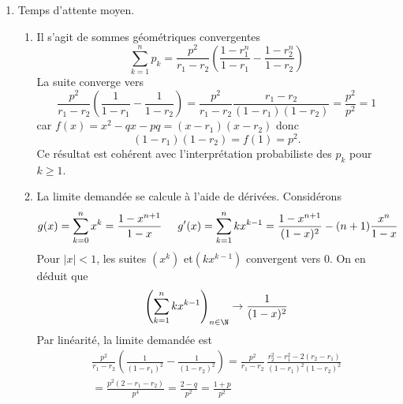 \begin{enumerate}
 \item Temps d'attente moyen.
\begin{enumerate}
 \item Il s'agit de sommes géométriques convergentes
\begin{displaymath}
\sum_{k=1}^{n}p_k = \frac{p^2}{r_1-r_2}\left( \frac{1-r_1^{n}}{1-r_1} - \frac{1-r_2^{n}}{1-r_2}\right)  
\end{displaymath}
 La suite converge vers 
\begin{displaymath}
\frac{p^2}{r_1-r_2}\left( \frac{1}{1-r_1} - \frac{1}{1-r_2}\right)
= \frac{p^2}{r_1-r_2}\frac{r_1-r_2}{(1-r_1)(1-r_2)}
= \frac{p^2}{p^2} = 1
\end{displaymath}
car $f(x)=x^2-qx-pq=(x-r_1)(x-r_2)$ donc 
\begin{displaymath}
 (1-r_1)(1-r_2)=f(1)=p^2.
\end{displaymath}
Ce résultat est cohérent avec l'interprétation probabiliste des $p_k$ pour $k\geq 1$.
 
 \item La limite demandée se calcule à l'aide de dérivées. Considérons
\begin{displaymath}
 g(x) = \sum_{k=0}^n x^k = \frac{1-x^{n+1}}{1-x}\hspace{0.5cm}
 g'(x) = \sum_{k=1}^n kx^{k-1} = \frac{1-x^{n+1}}{(1-x)^2}- (n+1)\frac{x^{n}}{1-x}
\end{displaymath}
Pour $|x|<1$, les suites $(x^k)$ et$(kx^{k-1})$ convergent vers $0$. On en déduit que 
\begin{displaymath}
 \left( \sum_{k=1}^n kx^{k-1} \right)_{n \in \N} \rightarrow \frac{1}{(1-x)^2}
\end{displaymath}
Par linéarité, la limite demandée est
\begin{multline*}
\frac{p^2}{r_1-r_2}\left( \frac{1}{(1-r_1)^2} - \frac{1}{(1-r_2)^2}\right)
= \frac{p^2}{r_1-r_2} \, \frac{r_2^2-r_1^2 -2(r_2-r_1)}{(1-r_1)^2(1-r_2)^2}\\
= \frac{p^2(2-r_1 - r_2)}{p^4}
= \frac{2-q}{p^2}
= \frac{1+p}{p^2}
\end{multline*}

\end{enumerate}
\end{enumerate}

